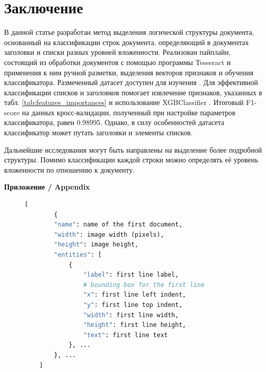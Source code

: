 \documentclass{ProcISPRAS}
\begin{document}
\section{Заключение}
В данной статье разработан метод выделения логической структуры документа, основанный на классификации строк документа, определяющий в документах заголовки и списки разных уровней вложенности.
Реализован пайплайн, состоящий из обработки документов с помощью программы Tesseract \cite{tesseract} и применения к ним ручной разметки, выделения векторов признаков и обучения классификатора. Размеченный датасет доступен для изучения \cite{data}. Для эффективной классификации списков и заголовков помогает извлечение признаков, указанных в табл. \ref{tab:features_importances} и использование XGBClassifier \cite{xgb}. Итоговый F1-score на данных кросс-валидации, полученный при настройке параметров классификатора, равен 0.98995. Однако, в силу особенностей датасета классификатор может путать заголовки и элементы списков.

Дальнейшие исследования могут быть направлены на выделение более подробной структуры. Помимо классификации каждой строки можно определять её уровень вложенности по отношению к документу.

\printbibliography

{\vskip 12pt\normalfont\sffamily\bfseries\large Приложение / Appendix}
\setlength{\parskip}{6pt}

\begin{figure}[ht]
    \centering
    \begin{lstlisting}[language=Python,frame=none,basicstyle=\ttfamily]
    [
        {
        "name": name of the first document,
        "width": image width (pixels),
        "height": image height,
        "entities": [
            {
                "label": first line label,
                # bounding box for the first line
                "x": first line left indent,
                "y": first line top indent,
                "width": first line width,
                "height": first line height,
                "text": first line text
            }, ...
        }, ...
    ]
    \end{lstlisting}
    \label{fig:label}
\end{figure}
\end{document}
